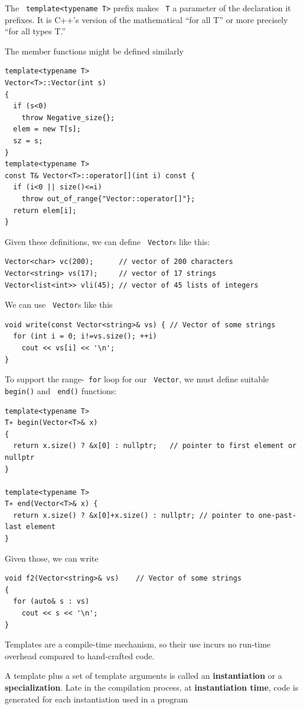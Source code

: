 \documentclass[11pt]{article}
\let\OldTexttt\texttt
\renewcommand{\texttt}[1]{\OldTexttt{\color{MidnightBlue} #1}}
\begin{document}
The \texttt{template<typename T>} prefix makes \texttt{T} a parameter of the declaration it prefixes. It is C++'s
version of the mathematical ``for all T'' or more precisely ``for all types T.''

The member functions might be defined similarly
\begin{verbatim}
template<typename T>
Vector<T>::Vector(int s)
{
  if (s<0)
    throw Negative_size{};
  elem = new T[s];
  sz = s;
}
template<typename T>
const T& Vector<T>::operator[](int i) const {
  if (i<0 || size()<=i)
    throw out_of_range{"Vector::operator[]"};
  return elem[i];
}
\end{verbatim}

Given these definitions, we can define \texttt{Vector}s like this:
\begin{verbatim}
Vector<char> vc(200);      // vector of 200 characters
Vector<string> vs(17);     // vector of 17 strings
Vector<list<int>> vli(45); // vector of 45 lists of integers
\end{verbatim}

We can use \texttt{Vector}s like this
\begin{verbatim}
void write(const Vector<string>& vs) { // Vector of some strings
  for (int i = 0; i!=vs.size(); ++i)
    cout << vs[i] << '\n';
}
\end{verbatim}

To support the range-\texttt{for} loop for our \texttt{Vector}, we must define suitable \texttt{begin()} and \texttt{end()}
functions:
\begin{verbatim}
template<typename T>
T∗ begin(Vector<T>& x)
{
  return x.size() ? &x[0] : nullptr;   // pointer to first element or nullptr
}

template<typename T>
T∗ end(Vector<T>& x) {
  return x.size() ? &x[0]+x.size() : nullptr; // pointer to one-past-last element
}
\end{verbatim}

Given those, we can write
\begin{verbatim}
void f2(Vector<string>& vs)    // Vector of some strings
{
  for (auto& s : vs)
    cout << s << '\n';
}
\end{verbatim}

Templates are a compile-time mechanism, so their use incurs no run-time overhead compared to
hand-crafted code.

A template plus a set of template arguments is called an \textbf{instantiation} or a \textbf{specialization}. Late
in the compilation process, at \textbf{instantiation time}, code is generated for each instantiation used
in a program
\end{document}
